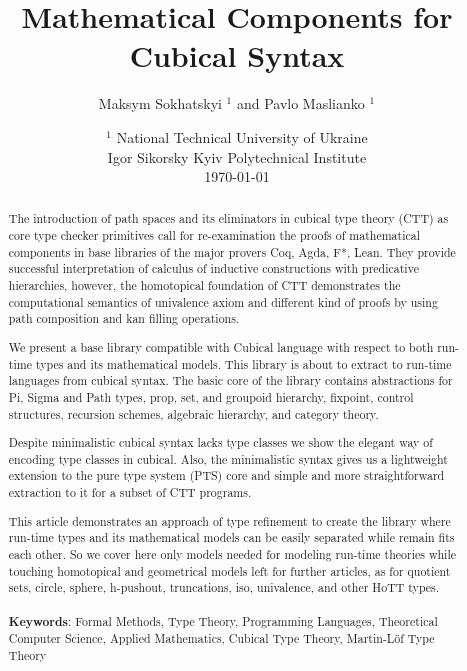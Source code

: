 \documentclass{article}
\begin{document}
\title{Mathematical Components for Cubical Syntax}
\author{Maksym Sokhatskyi $^1$ and Pavlo Maslianko $^1$}
\date{
    $^1$ National Technical University of Ukraine \\
    \small Igor Sikorsky Kyiv Polytechnical Institute\\
    \today
}

\maketitle

\begin{abstract}

The introduction of path spaces and its eliminators in cubical type theory (CTT)
as core type checker primitives call for re-examination the proofs of mathematical components
in base libraries of the major provers Coq, Agda, F*, Lean.
They provide successful interpretation of calculus of inductive constructions
with predicative hierarchies, however, the homotopical foundation of CTT demonstrates
the computational semantics of univalence axiom and different kind of proofs by using path
composition and kan filling operations.

We present a base library compatible with Cubical language \cite{Mortberg17}
with respect to both run-time types and its mathematical models.
This library is about to extract to run-time languages from cubical syntax.
The basic core of the library contains abstractions for Pi, Sigma and Path types,
prop, set, and groupoid hierarchy, fixpoint, control structures, recursion schemes,
algebraic hierarchy, and category theory.

Despite minimalistic cubical syntax lacks type classes we show the elegant
way of encoding type classes in cubical. Also, the minimalistic syntax
gives us a lightweight extension to the pure type system (PTS) core
and simple and more straightforward extraction to it for a subset of CTT programs.

This article demonstrates an approach of type refinement to create
the library where run-time types and its mathematical models can be
easily separated while remain fits each other.
So we cover here only models needed for modeling run-time theories
while touching homotopical and geometrical models left for further
articles, as for quotient sets, circle, sphere, h-pushout, truncations,
iso, univalence, and other HoTT types.
\\
\\
{\bf Keywords}: Formal Methods, Type Theory, Programming Languages,
          Theoretical Computer Science, Applied Mathematics,
          Cubical Type Theory, Martin-Löf Type Theory
\end{abstract}
\end{document}
